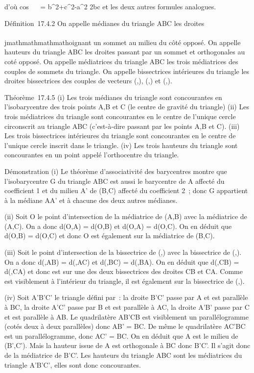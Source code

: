 d'où cos~ \alpha~ =
b^2+c^2-a^2 \over 2bc
et les deux autres formules analogues.

Définition~17.4.2 On appelle médianes du triangle ABC les droites
\\\\jmathmathmathmathoignant un sommet au milieu du côté opposé. On appelle hauteurs du
triangle ABC les droites passant par un sommet et orthogonales au coté
opposé. On appelle médiatrices du triangle ABC les trois médiatrices des
couples de sommets du triangle. On appelle bissectrices intérieures du
triangle les droites bissectrices des couples de vecteurs
(\overrightarrowAB,\overrightarrowAC),
(\overrightarrowBC,\overrightarrowBA)
et
(\overrightarrowCA,\overrightarrowCB).

Théorème~17.4.5 (i) Les trois médianes du triangle sont concourantes en
l'isobarycentre des trois points A,B et C (le centre de gravité du
triangle) (ii) Les trois médiatrices du triangle sont concourantes en le
centre de l'unique cercle circonscrit au triangle ABC (c'est-à-dire
passant par les points A,B et C). (iii) Les trois bissectrices
intérieures du triangle sont concourantes en le centre de l'unique
cercle inscrit dans le triangle. (iv) Les trois hauteurs du triangle
sont concourantes en un point appelé l'orthocentre du triangle.

Démonstration (i) Le théorème d'associativité des barycentres montre que
l'isobarycentre G du triangle ABC est aussi le barycentre de A affecté
du coefficient 1 et du milieu A' de (B,C) affecté du coefficient 2~;
donc G appartient à la médiane AA' et à chacune des deux autres
médianes.

(ii) Soit O le point d'intersection de la médiatrice de (A,B) avec la
médiatrice de (A,C). On a donc d(O,A) = d(O,B) et d(O,A) = d(O,C). On en
déduit que d(O,B) = d(O,C) et donc O est également sur la médiatrice de
(B,C).

(iii) Soit \Omega le point d'intersection de la bissectrice de
(\overrightarrowAB,\overrightarrowAC)
avec la bissectrice de
(\overrightarrowBC,\overrightarrowBA).
On a donc d(\Omega,AB) = d(\Omega,AC) et d(\Omega,BC) = d(\Omega,BA). On en déduit que
d(\Omega,CB) = d(\Omega,CA) et donc \Omega est sur une des deux bissectrices des
droites CB et CA. Comme \Omega est visiblement à l'intérieur du triangle, il
est également sur la bissectrice de
(\overrightarrowCA,\overrightarrowCB).

(iv) Soit A'B'C' le triangle défini par~: la droite B'C' passe par A et
est parallèle à BC, la droite A'C' passe par B et est parallèle à AC, la
droite A'B' passe par C et est parallèle à AB. Le quadrilatère AB'CB est
visiblement un parallélogramme (cotés deux à deux parallèles) donc AB' =
BC. De même le quadrilatère AC'BC est un parallélogramme, donc AC' = BC.
On en déduit que A est le milieu de (B',C'). Mais la hauteur issue de A
est orthogonale à BC donc B'C'. Il s'agit donc de la médiatrice de B'C'.
Les hauteurs du triangle ABC sont les médiatrices du triangle A'B'C',
elles sont donc concourantes.

